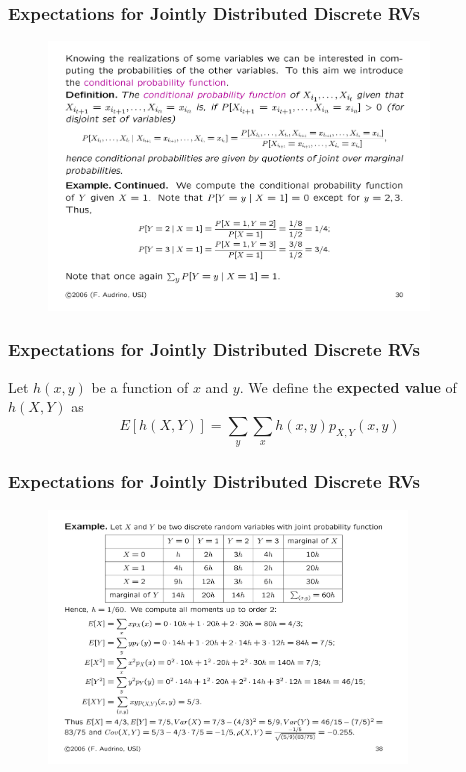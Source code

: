 \documentclass[notes=show,handout]{beamer}
\begin{document}
\begin{frame}
\frametitle{Expectations for Jointly Distributed Discrete RVs}
\begin{example}
\begin{figure}[ptb]\centering
\includegraphics[width=0.9\textwidth,height=0.45\textheight]{ex_audrins_2.pdf}
\end{figure}
\end{example}
\end{frame}


\begin{frame}%

\frametitle{Expectations for Jointly Distributed Discrete RVs}

\begin{definition}
Let $h(x,y)$ be a function of $x$ and $y$. 
We define the \textbf{expected value} of $h\left( X,Y\right) $ as%
\begin{equation*}
E\left[ h\left( X,Y\right) \right] =\sum_{y}\sum_{x}h\left( x,y\right)
p_{X,Y}\left( x,y\right)
\end{equation*}
\end{definition}
\end{frame}%




\begin{frame}
\frametitle{Expectations for Jointly Distributed Discrete RVs}
\begin{example}
\begin{figure}[ptb]\centering
\includegraphics[width=0.85\textwidth,height=0.78\textheight]{ex_tot.pdf}
\end{figure}
\end{example}
\end{frame}
\end{document}
